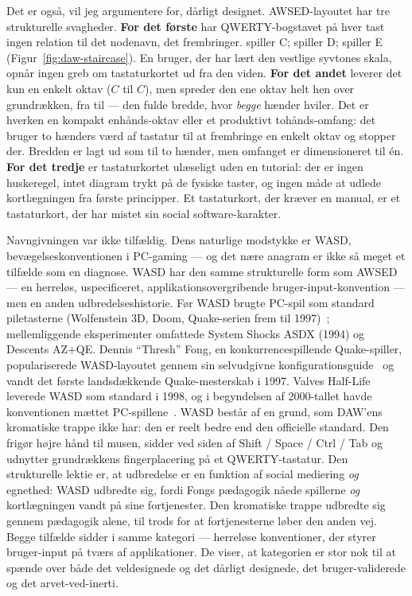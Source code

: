 \documentclass[10pt,letterpaper,twocolumn]{article}
\DeclareRobustCommand{\key}[1]{\tikz[baseline=(k.base)]{%
 \node[fill=keystroke, rounded corners=1.3pt, inner xsep=2.4pt,
    inner ysep=1.9pt, anchor=base, yshift=-1.2pt] at (0,0)
  {\footnotesize\ttfamily\bfseries\vphantom{A}\phantom{#1}};
 \node[draw=keystroke, line width=0.4pt, fill=keyfill,
    rounded corners=1.3pt, inner xsep=2.4pt, inner ysep=1.9pt,
    anchor=base] (k) at (0,0)
  {\footnotesize\ttfamily\bfseries\vphantom{A}#1};}}
\begin{document}
Det er også, vil jeg argumentere for, dårligt designet. AWSED-layoutet har tre strukturelle svagheder. \textbf{For det første} har QWERTY-bogstavet på hver tast ingen relation til det nodenavn, det frembringer. \key{A} spiller C; \key{S} spiller D; \key{D} spiller E (Figur~\ref{fig:daw-staircase}). En bruger, der har lært den vestlige syvtones skala, opnår ingen greb om tastaturkortet ud fra den viden. \textbf{For det andet} leverer det kun en enkelt oktav ($C$ til $C$), men spreder den ene oktav helt hen over grundrækken, fra \key{A} til \key{K} --- den fulde bredde, hvor \emph{begge} hænder hviler. Det er hverken en kompakt enhånds-oktav eller et produktivt tohånds-omfang: det bruger to hænders værd af tastatur til at frembringe en enkelt oktav og stopper der. Bredden er lagt ud som til to hænder, men omfanget er dimensioneret til én. \textbf{For det tredje} er tastaturkortet ulæseligt uden en tutorial: der er ingen huskeregel, intet diagram trykt på de fysiske taster, og ingen måde at udlede kortlægningen fra første principper. Et tastaturkort, der kræver en manual, er et tastaturkort, der har mistet sin social software-karakter.

Navngivningen var ikke tilfældig. Dens naturlige modstykke er WASD, bevægelseskonventionen i PC-gaming --- og det nære anagram er ikke så meget et tilfælde som en diagnose. WASD har den samme strukturelle form som AWSED --- en herreløs, uspecificeret, applikationsovergribende bruger-input-konvention --- men en anden udbredelseshistorie. Før WASD brugte PC-spil som standard piletasterne (Wolfenstein 3D, Doom, Quake-serien frem til 1997)~\citep{wikipedia_arrow_keys}; mellemliggende eksperimenter omfattede System Shocks ASDX (1994) og Descents AZ+QE. Dennis ``Thresh'' Fong, en konkurrencespillende Quake-spiller, populariserede WASD-layoutet gennem sin selvudgivne konfigurationsguide~\citep{thresh_quake_bible} og vandt det første landsdækkende Quake-mesterskab i 1997. Valves Half-Life leverede WASD som standard i 1998, og i begyndelsen af 2000-tallet havde konventionen mættet PC-spillene~\citep{fenlon2016wasd}. WASD består af en grund, som DAW'ens kromatiske trappe ikke har: den er reelt bedre end den officielle standard. Den frigør højre hånd til musen, sidder ved siden af Shift / Space / Ctrl / Tab og udnytter grundrækkens fingerplacering på et QWERTY-tastatur. Den strukturelle lektie er, at udbredelse er en funktion af social mediering \emph{og} egnethed: WASD udbredte sig, fordi Fongs pædagogik nåede spillerne \emph{og} kortlægningen vandt på sine fortjenester. Den kromatiske trappe udbredte sig gennem pædagogik alene, til trods for at fortjenesterne løber den anden vej. Begge tilfælde sidder i samme kategori --- herreløse konventioner, der styrer bruger-input på tværs af applikationer. De viser, at kategorien er stor nok til at spænde over både det veldesignede og det dårligt designede, det bruger-validerede og det arvet-ved-inerti.
\end{document}
